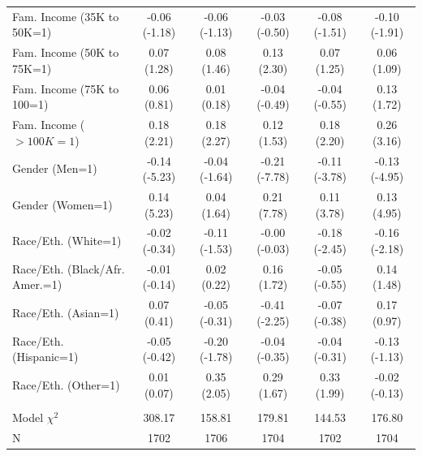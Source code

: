 \documentclass[11pt]{article}
\begin{document}
\begin{table}[t]
\begin{tabular*}{\hsize}{@{\extracolsep{\fill}} l*{5}{c}}
Fam. Income (35K to 50K=1)   &-0.06 (-1.18)&-0.06 (-1.13)&-0.03 (-0.50)&-0.08 (-1.51)&-0.10 (-1.91)\\
Fam. Income (50K to 75K=1)   &0.07 (1.28)&0.08 (1.46)&0.13 (2.30)&0.07 (1.25)&0.06 (1.09)\\
Fam. Income (75K to 100=1)   &0.06 (0.81)&0.01 (0.18)&-0.04 (-0.49)&-0.04 (-0.55)&0.13 (1.72)\\
Fam. Income ($>100K=1$)         &0.18 (2.21)&0.18 (2.27)&0.12 (1.53)&0.18 (2.20)&0.26 (3.16)\\
Gender (Men=1)                &-0.14 (-5.23)&-0.04 (-1.64)&-0.21 (-7.78)&-0.11 (-3.78)&-0.13 (-4.95)\\
Gender (Women=1)              &0.14 (5.23)&0.04 (1.64)&0.21 (7.78)&0.11 (3.78)&0.13 (4.95)\\
Race/Eth. (White=1)           &-0.02 (-0.34)&-0.11 (-1.53)&-0.00 (-0.03)&-0.18 (-2.45)&-0.16 (-2.18)\\
Race/Eth. (Black/Afr. Amer.=1)&-0.01 (-0.14)&0.02 (0.22)&0.16 (1.72)&-0.05 (-0.55)&0.14 (1.48)\\
Race/Eth. (Asian=1)           &0.07 (0.41)&-0.05 (-0.31)&-0.41 (-2.25)&-0.07 (-0.38)&0.17 (0.97)\\
Race/Eth. (Hispanic=1)        &-0.05 (-0.42)&-0.20 (-1.78)&-0.04 (-0.35)&-0.04 (-0.31)&-0.13 (-1.13)\\
Race/Eth. (Other=1)           &0.01 (0.07)&0.35 (2.05)&0.29 (1.67)&0.33 (1.99)&-0.02 (-0.13)\\ \\
Model $\chi^{2}$&308.17&   158.81&   179.81&   144.53&   176.80\\
N&     1702&     1706&     1704&     1702&     1704\\
\hline
\end{tabular*}
\label{tab2a}
\end{table}
\end{document}
